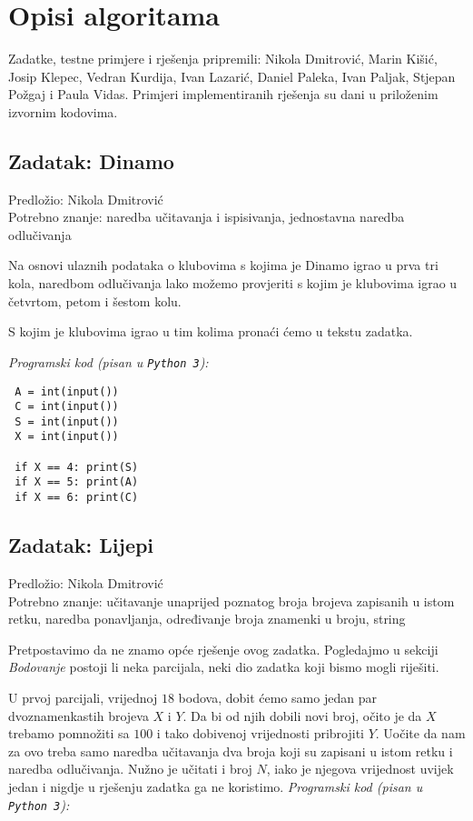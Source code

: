 \documentclass[a4paper]{article}
\begin{document}
\section*{Opisi algoritama}
Zadatke, testne primjere i rješenja pripremili: Nikola Dmitrović, Marin Kišić,
Josip Klepec, Vedran Kurdija, Ivan Lazarić, Daniel Paleka, Ivan Paljak, Stjepan Požgaj i
Paula Vidas. Primjeri implementiranih rješenja su dani u priloženim izvornim
kodovima.

\subsection*{Zadatak: Dinamo}
\textsf{Predložio: Nikola Dmitrović}\\
\textsf{Potrebno znanje: naredba učitavanja i ispisivanja, jednostavna naredba
odlučivanja}

Na osnovi ulaznih podataka o klubovima s kojima je Dinamo igrao u prva tri kola,
naredbom odlučivanja lako možemo provjeriti s kojim je klubovima igrao u
četvrtom, petom i šestom kolu.

S kojim je klubovima igrao u tim kolima pronaći ćemo u tekstu zadatka.

\textit{Programski kod (pisan u \texttt{Python 3}):}

\vspace{-2ex}
\begin{verbatim}
 A = int(input())
 C = int(input())
 S = int(input())
 X = int(input())

 if X == 4: print(S)
 if X == 5: print(A)
 if X == 6: print(C)
\end{verbatim}

\subsection*{Zadatak: Lijepi}
\textsf{Predložio: Nikola Dmitrović}\\
\textsf{Potrebno znanje: učitavanje unaprijed poznatog broja brojeva zapisanih
u istom retku, naredba ponavljanja, određivanje broja znamenki u broju, string}

Pretpostavimo da ne znamo opće rješenje ovog zadatka. Pogledajmo u sekciji
\textit{Bodovanje} postoji li neka parcijala, neki dio zadatka koji bismo mogli
riješiti.

U prvoj parcijali, vrijednoj $18$ bodova, dobit ćemo samo jedan par
dvoznamenkastih brojeva $X$ i $Y$. Da bi od njih dobili novi broj, očito je da
$X$ trebamo pomnožiti sa $100$ i tako dobivenoj vrijednosti pribrojiti $Y$.
Uočite da nam za ovo treba samo naredba učitavanja dva broja koji su zapisani u
istom retku i naredba odlučivanja. Nužno je učitati i broj $N$, iako je njegova
vrijednost uvijek jedan i nigdje u rješenju zadatka ga ne koristimo.
\textit{Programski kod (pisan u \texttt{Python 3}):}
\end{document}

